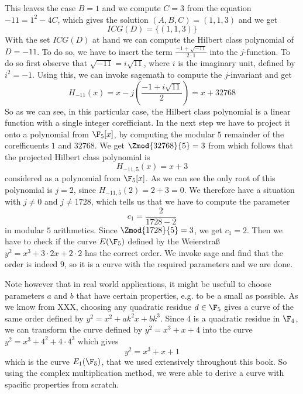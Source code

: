 \begin{example}
This leaves the case $B=1$ and we compute $C=3$ from the equation $-11 = 1^2 -4C$, which gives the solution $(A,B,C)=(1,1,3)$ and we get
$$
ICG(D)=\{(1,1,3)\}
$$
With the set $ICG(D)$ at hand we can compute the Hilbert class polynomial of $D=-11$. To do so, we have to insert the term $\frac{-1+\sqrt{-11}}{2\cdot1}$ into the $j$-function. To do so first observe that $\sqrt{-11}=i\sqrt{11}$, where $i$ is the imaginary unit, defined by $i^2=-1$. Using this, we can invoke sagemath to compute the $j$-invariant and get 
$$
H_{-11}(x) = x - j\left(\frac{-1+i\sqrt{11}}{2}\right) = x + 32768
$$
So as we can see, in this particular case, the Hilbert class polynomial is a linear function with a single integer corefficiant. In the next step we have to project it onto a polynomial from $\F_5[x]$, by computing the modular $5$ remainder of the corefficuents $1$ and $32768$. We get $\Zmod{32768}{5}=3$ from which follows that the projected Hilbert class polynomial is  
$$
H_{-11,5}(x)=x+3
$$ 
considered as a polynomial from $\F_5[x]$. As we can see the only root of this polynomial is $j=2$, since $H_{-11,5}(2)=2+3=0$. We therefore have a situation with $j\neq 0$ and $j\neq 1728$, which tells us that we have to compute the parameter
$$
c_1=\frac{2}{1728-2}
$$
in modular $5$ arithmetics. Since $\Zmod{1728}{5}=3$, we get $c_1=2$. Then we have to check if the curve $E(\F_5)$ defined by the Weierstraß  $y^2 = x^3 + 3\cdot 2 x + 2\cdot 2$ has the correct order. We invoke sage and find that the order is indeed $9$, so it is a curve with the required parameters and we are done.

Note however that in real world applications, it might be usefull to choose parameters $a$ and $b$ that have certain properties, e.g. to be a small as possible. As we know from XXX, choosing any quadratic residue $d\in \F_5$ gives a curve of the same order defined by $y^2 = x^2 + a k^2 x + bk^3$. Since $4$ is a quadratic residue in $\F_4$, we can transform the curve defined by 
$y^2 = x^3 +x+4$ into the curve $y^2 = x^3 + 4^2 + 4\cdot 4^3$ which gives 
$$
y^2 = x^3 + x +1
$$
which is the curve $E_1(\F_5)$, that we used extensively throughout this book. So using the complex multiplication method, we were able to derive a curve with spacific properties from scratch.
\end{example}
